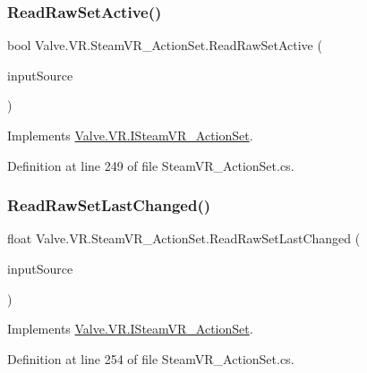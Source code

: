 \subsubsection{\texorpdfstring{ReadRawSetActive()}{ReadRawSetActive()}}
{\footnotesize\ttfamily bool Valve.\+V\+R.\+Steam\+V\+R\+\_\+\+Action\+Set.\+Read\+Raw\+Set\+Active (\begin{DoxyParamCaption}\item[{\mbox{\hyperlink{namespace_valve_1_1_v_r_a82e5bf501cc3aa155444ee3f0662853f}{Steam\+V\+R\+\_\+\+Input\+\_\+\+Sources}}}]{input\+Source }\end{DoxyParamCaption})}



Implements \mbox{\hyperlink{interface_valve_1_1_v_r_1_1_i_steam_v_r___action_set_a7db619853c00ffb7ac16ba370921ac4e}{Valve.\+V\+R.\+I\+Steam\+V\+R\+\_\+\+Action\+Set}}.



Definition at line 249 of file Steam\+V\+R\+\_\+\+Action\+Set.\+cs.

\mbox{\label{class_valve_1_1_v_r_1_1_steam_v_r___action_set_afc8e7c4a2dbc8e182f34ec832bfd9b22}} 
\subsubsection{\texorpdfstring{ReadRawSetLastChanged()}{ReadRawSetLastChanged()}}
{\footnotesize\ttfamily float Valve.\+V\+R.\+Steam\+V\+R\+\_\+\+Action\+Set.\+Read\+Raw\+Set\+Last\+Changed (\begin{DoxyParamCaption}\item[{\mbox{\hyperlink{namespace_valve_1_1_v_r_a82e5bf501cc3aa155444ee3f0662853f}{Steam\+V\+R\+\_\+\+Input\+\_\+\+Sources}}}]{input\+Source }\end{DoxyParamCaption})}



Implements \mbox{\hyperlink{interface_valve_1_1_v_r_1_1_i_steam_v_r___action_set_a7647555ffdd2708516296e140100a8ae}{Valve.\+V\+R.\+I\+Steam\+V\+R\+\_\+\+Action\+Set}}.



Definition at line 254 of file Steam\+V\+R\+\_\+\+Action\+Set.\+cs.

